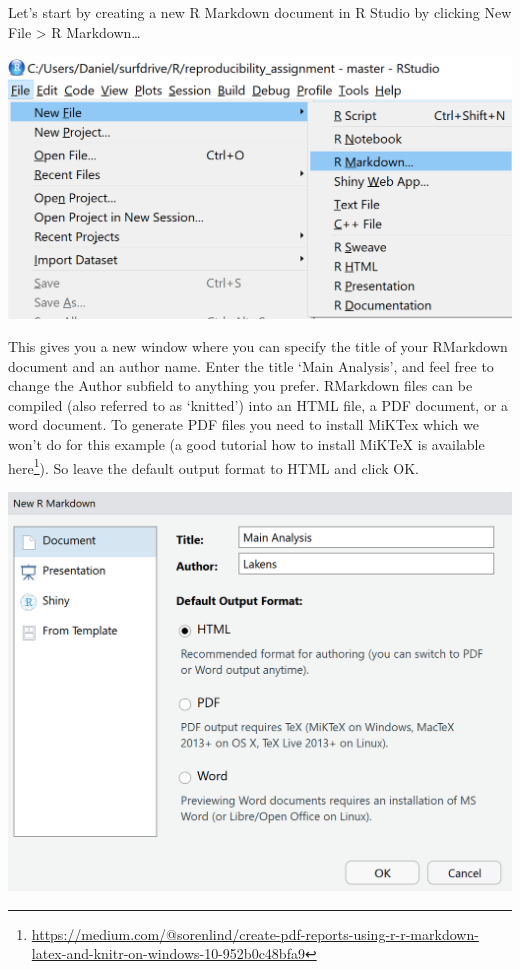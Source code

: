 \documentclass[
  oneside]{krantz}
\renewcommand{\href}[2]{#2\footnote{\url{#1}}}
\begin{document}
Let's start by creating a new R Markdown document in R Studio by clicking New
File \textgreater{} R Markdown\ldots{}

\begin{center}\includegraphics[width=1\linewidth]{images/f13fad91521fb984d12577416fa1fa99} \end{center}

This gives you a new window where you can specify the title of your RMarkdown
document and an author name. Enter the title `Main Analysis', and feel free to
change the Author subfield to anything you prefer. RMarkdown files can be
compiled (also referred to as `knitted') into an HTML file, a PDF document, or a
word document. To generate PDF files you need to install MiKTex which we won't
do for this example (\href{https://medium.com/@sorenlind/create-pdf-reports-using-r-r-markdown-latex-and-knitr-on-windows-10-952b0c48bfa9}{a good tutorial how to install MiKTeX is available
here}).
So leave the default output format to HTML and click OK.

\begin{center}\includegraphics[width=1\linewidth]{images/be373a55333121dee2669025ba9fff3d} \end{center}
\end{document}
